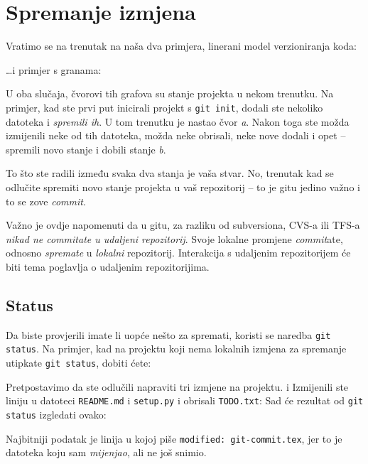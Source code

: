 \chapter*{Spremanje izmjena}

Vratimo se na trenutak na naša dva primjera, linerani model verzioniranja koda:



\dots{}i primjer s granama:



U oba slučaja, čvorovi tih grafova su stanje projekta u nekom trenutku.
Na primjer, kad ste prvi put inicirali projekt s \verb+git init+, dodali ste nekoliko datoteka i \emph{spremili ih}. 
U tom trenutku je nastao čvor \emph a.
Nakon toga ste možda izmijenili neke od tih datoteka, možda neke obrisali, neke nove dodali i opet -- spremili novo stanje i dobili stanje \emph b.

To što ste radili između svaka dva stanja je vaša stvar.
No, trenutak kad se odlučite spremiti novo stanje projekta u vaš repozitorij -- to je gitu jedino važno i to se zove \emph{commit}.

Važno je ovdje napomenuti da u gitu, za razliku od subversiona, CVS-a ili TFS-a \emph{nikad ne commitate u udaljeni repozitorij}. 
Svoje lokalne promjene \emph{commit}ate, odnosno \emph{spremate} u \emph{lokalni} repozitorij.
Interakcija s udaljenim repozitorijem će biti tema poglavlja o udaljenim repozitorijima.

\section*{Status}

Da biste provjerili imate li uopće nešto za spremati, koristi se naredba \verb+git status+.
Na primjer, kad na projektu koji nema lokalnih izmjena za spremanje utipkate \verb+git status+, dobiti ćete:



Pretpostavimo da ste odlučili napraviti tri izmjene na projektu. i
Izmijenili ste liniju u datoteci \verb+README.md+ i \verb+setup.py+ i obrisali \verb+TODO.txt+:
Sad će rezultat od \verb+git status+ izgledati ovako:



Najbitniji podatak je linija u kojoj piše \verb+modified: git-commit.tex+, jer to je datoteka koju sam \emph{mijenjao}, ali ne još snimio.

